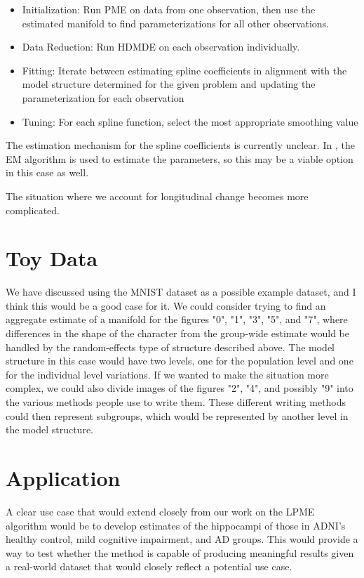 \documentclass[11pt, reqno]{article}
\begin{document}
\begin{itemize}
  \item Initialization: Run PME on data from one observation, then use the estimated manifold to find parameterizations for all other observations.
  \item Data Reduction: Run HDMDE on each observation individually.
  \item Fitting: Iterate between estimating spline coefficients in alignment with the model structure determined for the given problem and updating the parameterization for each observation
  \item Tuning: For each spline function, select the most appropriate smoothing value
\end{itemize}

The estimation mechanism for the spline coefficients is currently unclear. In \cite{schulamIntegrativeAnalysisUsing2016}, the EM algorithm is used to estimate the parameters, so this may be a viable option in this case as well.

The situation where we account for longitudinal change becomes more complicated. 

\section{Toy Data}

We have discussed using the MNIST dataset as a possible example dataset, and I think this would be a good case for it. We could consider trying to find an aggregate estimate of a manifold for the figures "0", "1", "3", "5", and "7", where differences in the shape of the character from the group-wide estimate would be handled by the random-effects type of structure described above. The model structure in this case would have two levels, one for the population level and one for the individual level variations. If we wanted to make the situation more complex, we could also divide images of the figures "2", "4", and possibly "9" into the various methods people use to write them. These different writing methods could then represent subgroups, which would be represented by another level in the model structure.

\section{Application}

A clear use case that would extend closely from our work on the LPME algorithm would be to develop estimates of the hippocampi of those in ADNI's healthy control, mild cognitive impairment, and AD groups. This would provide a way to test whether the method is capable of producing meaningful results given a real-world dataset that would closely reflect a potential use case.
\end{document}
